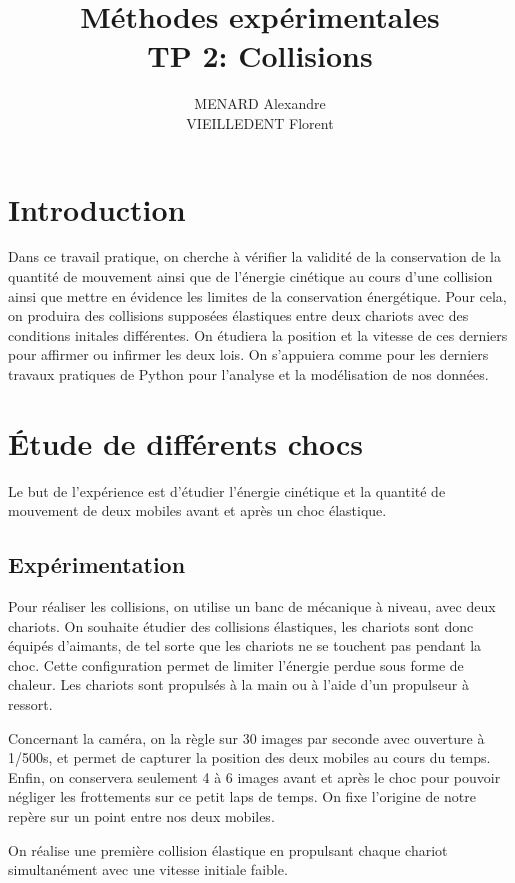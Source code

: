 \documentclass[12pt]{article}
\title{\textbf{Méthodes expérimentales} \\ TP 2: Collisions}
\author{MENARD Alexandre \\ VIEILLEDENT Florent}
\begin{document}
\maketitle

\section*{Introduction}
Dans ce travail pratique, on cherche à vérifier la validité de la conservation de la quantité de mouvement 
ainsi que de l'énergie cinétique au cours d'une collision ainsi que mettre en évidence les limites de la conservation énergétique.
Pour cela, on produira des collisions supposées élastiques entre deux chariots avec des conditions initales différentes. On étudiera 
la position et la vitesse de ces derniers pour affirmer ou infirmer
les deux lois. On s'appuiera comme pour les derniers travaux pratiques de Python pour l'analyse et la modélisation de nos données.


\newpage
\section{Étude de différents chocs }

Le but de l'expérience est d'étudier l'énergie cinétique et la quantité de mouvement de deux mobiles avant et après un choc élastique. 

\subsection{Expérimentation}
Pour réaliser les collisions, on utilise un banc de mécanique à niveau, avec deux chariots. On souhaite étudier des collisions élastiques, les chariots sont donc équipés d'aimants, de tel sorte que les chariots ne se touchent pas pendant la choc. Cette configuration permet de limiter l'énergie perdue sous forme de chaleur. Les chariots sont propulsés à la main ou à l'aide d'un propulseur à ressort. 

Concernant la caméra, on la règle sur 30 images par seconde avec ouverture à 1/500s, et permet de capturer la position des deux mobiles au cours du temps.
Enfin, on conservera seulement 4 à 6 images avant et après le choc pour pouvoir négliger les frottements sur ce petit laps de temps. On fixe l'origine de notre repère sur un point entre nos deux mobiles. 

On réalise une première collision élastique en propulsant chaque chariot simultanément avec une vitesse initiale faible.
\end{document}
